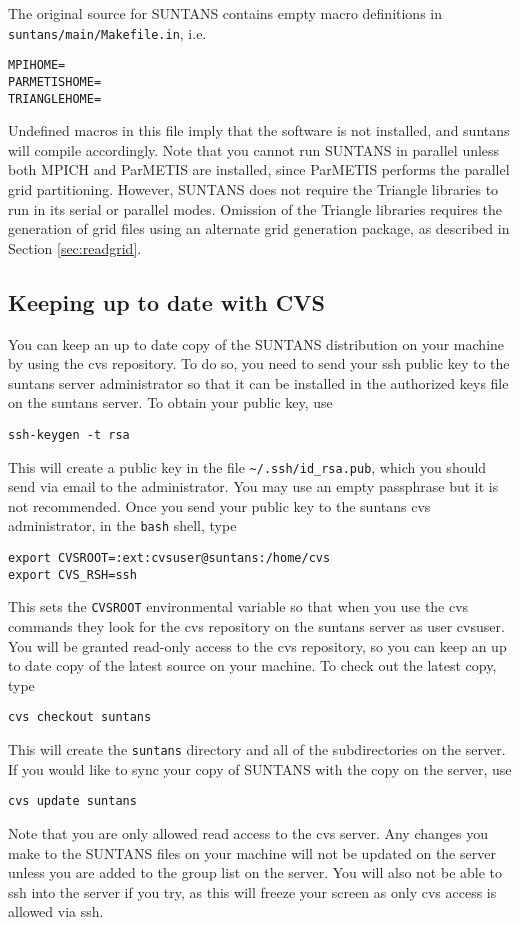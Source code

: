 The original source for SUNTANS contains empty macro definitions in \\
\verb+suntans/main/Makefile.in+, i.e.
\begin{verbatim}
MPIHOME=
PARMETISHOME=
TRIANGLEHOME=
\end{verbatim}
Undefined macros in this file imply that the software is not installed, and suntans will compile
accordingly.  Note that you cannot run SUNTANS in parallel unless both MPICH and ParMETIS are
installed, since ParMETIS performs the parallel grid partitioning.  However, SUNTANS does not
require the Triangle libraries to run in its serial or parallel modes.  Omission of the Triangle 
libraries requires the generation of grid files using an alternate grid generation package, 
as described in Section  \ref{sec:readgrid}.

\subsection{Keeping up to date with CVS} \label{sec:cvs}

You can keep an up to date copy of the SUNTANS distribution on your machine by using the
cvs repository.  To do so, you need to send your ssh public key to the suntans server administrator so that
it can be installed in the authorized keys file on the suntans server.  To obtain your
public key, use
\begin{verbatim}
ssh-keygen -t rsa
\end{verbatim}
This will create a public key in the file \verb+~/.ssh/id_rsa.pub+, which you should send
via email to the administrator.  You may use an empty passphrase but it is not recommended.
Once you send your public key to the suntans cvs administrator, in the \verb+bash+ shell, type
\begin{verbatim}
export CVSROOT=:ext:cvsuser@suntans:/home/cvs
export CVS_RSH=ssh
\end{verbatim}
This sets the \verb+CVSROOT+ environmental variable so that when you use the cvs commands
they look for the cvs repository on the suntans server as user cvsuser.
You will be granted read-only access to the cvs repository, so you can keep an up to date
copy of the latest source on your machine.  To check out the latest copy, type
\begin{verbatim}
cvs checkout suntans
\end{verbatim}
This will create the \verb+suntans+ directory and all of the subdirectories on the server.
If you would like to sync your copy of SUNTANS with the copy on the server, use
\begin{verbatim}
cvs update suntans
\end{verbatim}
Note that you are only allowed read access to the cvs server.  Any changes you make to
the SUNTANS files on your machine will not be updated on the server unless you are added
to the group list on the server.  You will also not be able to ssh into the server if you
try, as this will freeze your screen as only cvs access is allowed via ssh.
